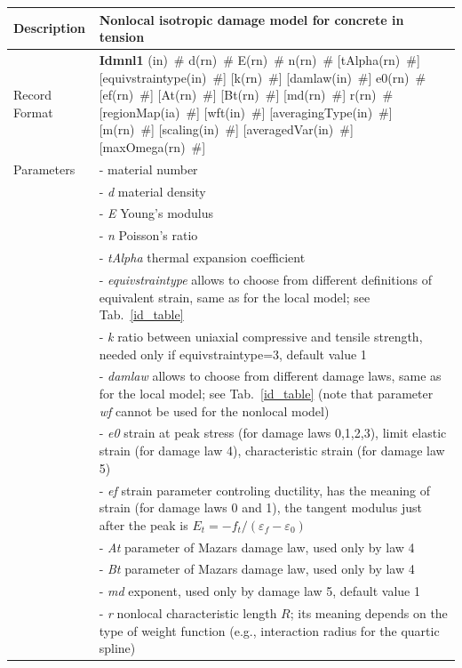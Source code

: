 \documentclass[a4paper]{article}
\newcommand{\descitem}[1]{{\noindent \bf #1}}
\newcommand{\elemparam}[2]{{{#1\tiny (#2)}~\#}}
\newcommand{\param}[1]{{\it #1}}
\begin{document}
\begin{table}[!htb]
\begin{tabular}{|l|p{9cm}|}
\hline
Description & Nonlocal isotropic damage model for concrete in tension\\
\hline
Record Format & \descitem{Idmnl1} 
\elemparam{}{in} 
\elemparam{d}{rn} 
\elemparam{E}{rn}
\elemparam{n}{rn}  
[\elemparam{tAlpha}{rn}]
[\elemparam{equivstraintype}{in}] 
[\elemparam{k}{rn}] 
[\elemparam{damlaw}{in}] 
\elemparam{e0}{rn}
[\elemparam{ef}{rn}] 
[\elemparam{At}{rn}] 
[\elemparam{Bt}{rn}] 
[\elemparam{md}{rn}] 
\elemparam{r}{rn}
[\elemparam{regionMap}{ia}]
[\elemparam{wft}{in}]
[\elemparam{averagingType}{in}]
[\elemparam{m}{rn}]
[\elemparam{scaling}{in}]
[\elemparam{averagedVar}{in}]
[\elemparam{maxOmega}{rn}]\\
Parameters &- \param{} material number\\
&- \param{d} material density\\
&- \param{E} Young's modulus\\
&- \param{n} Poisson's ratio\\
&- \param{tAlpha} thermal expansion coefficient\\
&- \param{equivstraintype} allows to choose from different definitions
of equivalent strain, same as for the local model; see Tab.~\ref{id_table}\\
&- \param{k} ratio between uniaxial compressive and tensile strength, needed only if equivstraintype=3, default value 1\\
&- \param{damlaw} allows to choose from different damage laws, 
same as for the local model; see Tab.~\ref{id_table}
(note that parameter {\it wf} cannot be used for the nonlocal model)\\
&- \param{e0} strain at peak stress (for damage laws 0,1,2,3), limit elastic strain (for damage law 4), characteristic strain (for damage law 5)\\
&- \param{ef} strain parameter controling ductility, has the meaning of strain (for damage laws 0 and 1), the tangent modulus just after the peak is
$E_t=-f_t/(\varepsilon_f-\varepsilon_0)$\\
&- \param{At} parameter of Mazars damage law, used only by law 4\\
&- \param{Bt} parameter of Mazars damage law, used only by law 4\\
&- \param{md} exponent, used only by damage law 5, default value 1\\
&- \param{r} nonlocal characteristic length $R$; its meaning depends
on the type of weight function (e.g., interaction radius for the quartic spline)\\

\end{tabular}
\end{table}
\end{document}
